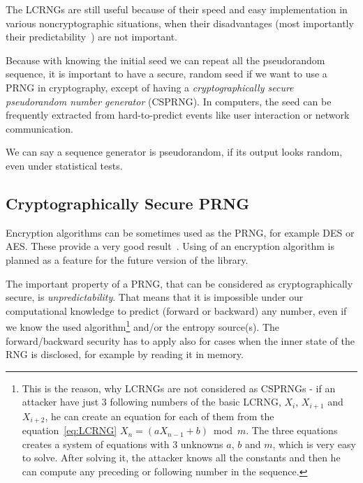 \par{
The LCRNGs are still useful because of their speed and easy implementation 
in various noncryptographic situations, when their disadvantages 
(most importantly their predictability~\cite[p.~152, 153]
{CryptographyAndNetworkSecurity}) 
are not important.~\cite[chapter~16.1]{AppliedCryptography}
}

\par{
Because with knowing the initial seed we can repeat all the pseudorandom 
sequence, it is important to have a secure, random seed if we want to use 
a PRNG in cryptography, except of having a {\em cryptographically secure 
pseudorandom number generator} (CSPRNG). In computers, the seed 
can be frequently extracted from hard-to-predict events like user interaction 
or network communication.
}

\par{
We can say a sequence generator is pseudorandom, if its output looks random, 
even under statistical tests.
}

\subsection{Cryptographically Secure PRNG}
\par{
Encryption algorithms can be sometimes used as the PRNG,
 for example DES or AES. These provide a very good 
 result~\cite[p.~153-156]{CryptographyAndNetworkSecurity}. 
 Using of an encryption algorithm is planned as a feature for the future version 
 of the library.
}

\par{
The important property of a PRNG, that can be considered as cryptographically 
secure, is {\em unpredictability}. That means that it is impossible under our 
computational knowledge to predict (forward or backward) any number, even if 
we know the used algorithm\footnote{This is the reason, why LCRNGs are not 
considered as CSPRNGs - if an attacker have just 3 following numbers 
of the basic LCRNG, $X_{i}$, $X_{i+1}$ and $X_{i+2}$, he can create 
an equation for each of them from the equation~\ref{eq:LCRNG} 
$X_n = (aX_{n-1} + b)$~mod~$m$. The three equations creates a system 
of equations with 3 unknowns $a$, $b$ and $m$, which is very easy to solve. 
After solving it, the attacker knows all the constants and then he can compute 
any preceding or following number in the sequence.} and/or the entropy 
source(s). The forward/backward security has to apply also for cases when 
the inner state of the RNG is disclosed, for example by reading it in memory.
}

